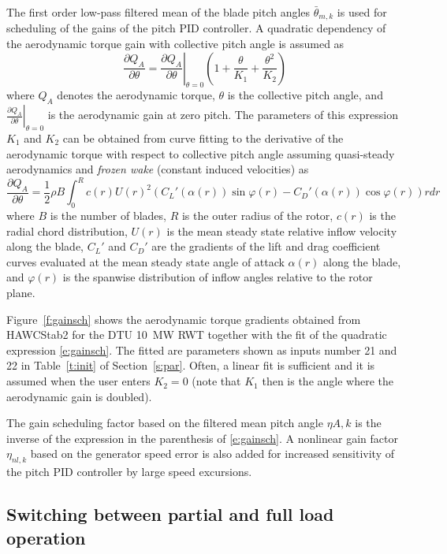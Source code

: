 The first order low-pass filtered mean of the blade pitch angles $\bar \theta_{m,k}$ is used for scheduling of the gains of the pitch PID controller. A quadratic dependency of the aerodynamic torque gain with collective pitch angle is assumed as
\begin{equation}\label{e:gainsch}
\frac{\partial Q_A}{\partial \theta}= \left. \frac{\partial Q_A}{\partial \theta}\right|_{\theta=0}\left(1 + \frac{\theta}{K_{1}} + \frac{\theta^2}{K_{2}}\right)
\end{equation}
where $Q_A$ denotes the aerodynamic torque, $\theta$ is the collective pitch angle, and $\left. \frac{\partial Q_A}{\partial \theta}\right|_{\theta=0}$ is the aerodynamic gain at zero pitch. The parameters of this expression $K_1$ and $K_2$ can be obtained from curve fitting to the derivative of the aerodynamic torque with respect to collective pitch angle assuming quasi-steady aerodynamics and \emph{frozen wake} (constant induced velocities) as
\begin{equation}\label{e:dqadt}
\frac{\partial Q_A}{\partial \theta} = \frac12 \rho B \int_0^R c(r) U(r)^2 \left(
  C_L'(\alpha(r)) \sin \varphi(r)
- C_D'(\alpha(r)) \cos \varphi(r) \right) r dr
\end{equation}
where $B$ is the number of blades, $R$ is the outer radius of the rotor, $c(r)$ is the radial chord distribution, $U(r)$ is the mean steady state relative inflow velocity along the blade, $C_L'$ and $C_D'$ are the gradients of the lift and drag coefficient curves evaluated at the mean steady state angle of attack $\alpha(r)$ along the blade, and $\varphi(r)$ is the spanwise distribution of inflow angles relative to the rotor plane.

Figure~\ref{f:gainsch} shows the aerodynamic torque gradients obtained from HAWCStab2 for the DTU 10~MW RWT together with the fit of the quadratic expression \eqref{e:gainsch}. The fitted are parameters shown as inputs number 21 and 22 in Table~\ref{t:init} of Section~\ref{s:par}. Often, a linear fit is sufficient and it is assumed when the user enters $K_2=0$ (note that $K_1$ then is the angle where the aerodynamic gain is doubled).

The gain scheduling factor based on the filtered mean pitch angle $\eta{A,k}$ is the inverse of the expression in the parenthesis of \eqref{e:gainsch}. A nonlinear gain factor $\eta_{nl,k}$ based on the generator speed error is also added for increased sensitivity of the pitch PID controller by large speed excursions.

\subsection{Switching between partial and full load operation}

